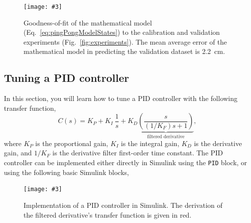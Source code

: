 \documentclass[10pt,twoside,openright]{article}
\newcommand{\mijnfiguur}[5][ht]{            %
    \begin{figure}[#1]                      %
        \begin{center}                      %
            \texttt{[image: \#3]}        %
        \end{center}
        \caption{#4\label{#5}}          %
    \end{figure}
    }
\begin{document}
\mijnfiguur[h!]{width=\linewidth}{calibration.pdf}{Goodness-of-fit of the mathematical model (Eq.~\ref{eq:pingPongModelStates}) to the calibration and validation experiments (Fig.~\ref{fig:experiments}). The mean average error of the mathematical model in predicting the validation dataset is 2.2~cm.}{fig:calibration}

\pagebreak
\subsection{Tuning a PID controller}

In this section, you will learn how to tune a PID controller with the following transfer function,
\begin{equation}
C(s) = K_P + K_I~ \dfrac{1}{s} + K_D \underbrace{\left( \dfrac{s}{\left(1/K_F\right) s + 1} \right)}_{\text{filtered derivative}},
\end{equation}
where $K_P$ is the proportional gain, $K_I$ is the integral gain, $K_D$ is the derivative gain, and $1/K_F$ is the derivative filter first-order time constant. The PID controller can be implemented either directly in Simulink using the \texttt{PID} block, or using the following basic Simulink blocks,

\mijnfiguur[h!]{width=0.7\linewidth}{PID_simulink.pdf}{Implementation of a PID controller in Simulink. The derivation of the filtered derivative's transfer function is given in red.}{fig:PID_simulink}
\end{document}
